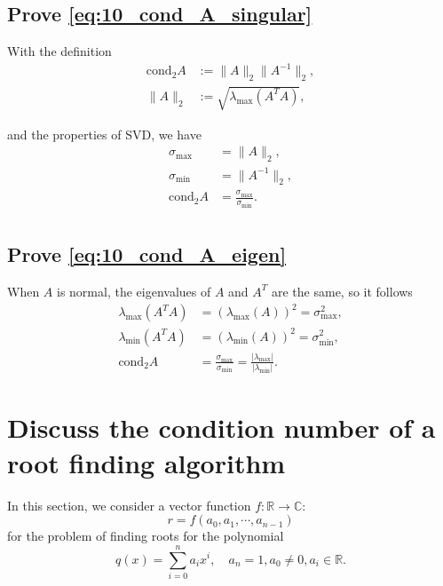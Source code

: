 \documentclass[a4paper]{article}
\begin{document}
\subsection{Prove \cref{eq:10_cond_A_singular}}

With the definition 
\begin{align}
    \text{cond}_2 A &:= \|A\|_2 \|A^{-1}\|_2, 
    \label{eq:10_cond_A_def} \\
    \|A\|_2 &:= \sqrt{\lambda_{\max}(A^TA)}, 
    \label{eq:10_2norm_A_def} 
\end{align}

and the properties of SVD, we have 
\begin{equation}
    \begin{aligned}
        \sigma_{\max} &= \|A\|_2, \\
        \sigma_{\min} &= \|A^{-1}\|_2, \\
        \text{cond}_2 A &= \frac{\sigma_{\max}}{\sigma_{\min}}. \\
    \end{aligned}
    \label{eq:10_cond_A_singular_proof}
\end{equation}

\subsection{Prove \cref{eq:10_cond_A_eigen}}

When $A$ is normal, the eigenvalues of $A$ and $A^{T}$ are the same, so it follows
\begin{equation}
    \begin{aligned}
        \lambda_{\max}(A^T A) &= (\lambda_{\max}(A))^2 = \sigma_{\max}^2, \\
        \lambda_{\min}(A^T A) &= (\lambda_{\min}(A))^2 = \sigma_{\min}^2, \\
        \text{cond}_2 A &= \frac{\sigma_{\max}}{\sigma_{\min}} = \frac{|\lambda_{\max}|}{|\lambda_{\min}|}.
    \end{aligned}
    \label{eq:10_cond_A_eigen_proof}
\end{equation}

\section{Discuss the condition number of a root finding algorithm}

In this section, we consider a vector function $f: \mathbb{R} \to \mathbb{C}:$
\begin{equation}
    r = f(a_0, a_1, \cdots, a_{n - 1})
    \label{eq:11_r_def}
\end{equation}
for the problem of finding roots for the polynomial 
\begin{equation}
    q(x) = \sum_{i = 0}^n a_i x^i, \quad a_n = 1, a_0 \ne 0, a_i \in \mathbb{R}.
    \label{eq:11_polynomial_def}
\end{equation}
\end{document}
